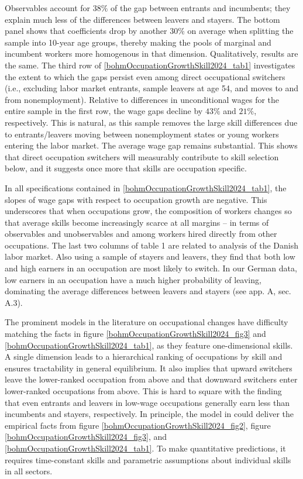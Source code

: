 \documentclass[12pt]{article}
\newcommand{\highlightP}[1]{{\emph{\color{MyPink}{#1}}}}
\theoremstyle{definition}
\begin{document}
Observables account for $38\%$ of the gap between entrants and incumbents; they explain much less of the differences between leavers and stayers. The bottom panel shows that coefficients drop by another $30\%$ on average when splitting the sample into 10-year age groups, thereby making the pools of marginal and incumbent workers more homogenous in that dimension. Qualitatively, results are the same. \highlightP{These patterns underscore that the wage gaps are related to skill selection in education and age. At the same time, the majority of gaps remain unexplained by standard Mincer variables.} The third row of \ref{bohmOccupationGrowthSkill2024_tab1} investigates the extent to which the gaps persist even among direct occupational switchers (i.e., excluding labor market entrants, sample leavers at age 54, and moves to and from nonemployment). Relative to differences in unconditional wages for the entire sample in the first row, the wage gaps decline by $43\%$ and $21\%$, respectively. This is natural, as this sample removes the large skill differences due to entrants/leavers moving between nonemployment states or young workers entering the labor market. The average wage gap remains substantial. This shows that direct occupation switchers will measurably contribute to skill selection below, and it suggests once more that skills are occupation specific.

In all specifications contained in \ref{bohmOccupationGrowthSkill2024_tab1}, the slopes of wage gaps with respect to occupation growth are negative. This underscores that when occupations grow, the composition of workers changes so that average skills become increasingly scarce at all margins -- in terms of observables and unobservables and among workers hired directly from other occupations. The last two columns of table 1 are related to \citet{groesUShapesOccupationalMobility2015} analysis of the Danish labor market. Also using a sample of stayers and leavers, they find that both low and high earners in an occupation are most likely to switch. In our German data, low earners in an occupation have a much higher probability of leaving, dominating the average differences between leavers and stayers (see app. A, sec. A.3).

The prominent models in the literature on occupational changes have difficulty matching the facts in figure \ref{bohmOccupationGrowthSkill2024_fig3} and \ref{bohmOccupationGrowthSkill2024_tab1}, as they feature one-dimensional skills. A single dimension leads to a hierarchical ranking of occupations by skill and ensures tractability in general equilibrium. It also implies that upward switchers leave the lower-ranked occupation from above and that downward switchers enter lower-ranked occupations from above. This is hard to square with the finding that even entrants and leavers in low-wage occupations generally earn less than incumbents and stayers, respectively. In principle, the model in \citet{hsiehAllocationTalentUS2019} could deliver the empirical facts from figure \ref{bohmOccupationGrowthSkill2024_fig2}, figure \ref{bohmOccupationGrowthSkill2024_fig3}, and \ref{bohmOccupationGrowthSkill2024_tab1}. To make quantitative predictions, it requires time-constant skills and parametric assumptions about individual skills in all sectors.  
\end{document}
